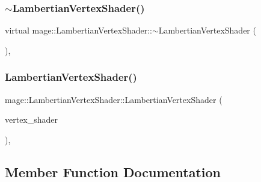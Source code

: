 \hypertarget{classmage_1_1_lambertian_vertex_shader_a55636fd3817b97b6529690d6e3e5cd46}{}\label{classmage_1_1_lambertian_vertex_shader_a55636fd3817b97b6529690d6e3e5cd46} 
\subsubsection{\texorpdfstring{$\sim$\+Lambertian\+Vertex\+Shader()}{~LambertianVertexShader()}}
{\footnotesize\ttfamily virtual mage\+::\+Lambertian\+Vertex\+Shader\+::$\sim$\+Lambertian\+Vertex\+Shader (\begin{DoxyParamCaption}{ }\end{DoxyParamCaption})\hspace{0.3cm}{\ttfamily [virtual]}, {\ttfamily [default]}}

\hypertarget{classmage_1_1_lambertian_vertex_shader_add164d66906e307d95232b2c41567a21}{}\label{classmage_1_1_lambertian_vertex_shader_add164d66906e307d95232b2c41567a21} 
\subsubsection{\texorpdfstring{Lambertian\+Vertex\+Shader()}{LambertianVertexShader()}\hspace{0.1cm}{\footnotesize\ttfamily [2/2]}}
{\footnotesize\ttfamily mage\+::\+Lambertian\+Vertex\+Shader\+::\+Lambertian\+Vertex\+Shader (\begin{DoxyParamCaption}\item[{const \hyperlink{classmage_1_1_lambertian_vertex_shader}{Lambertian\+Vertex\+Shader} \&}]{vertex\+\_\+shader }\end{DoxyParamCaption})\hspace{0.3cm}{\ttfamily [private]}, {\ttfamily [delete]}}



\subsection{Member Function Documentation}
\hypertarget{classmage_1_1_lambertian_vertex_shader_a974b43346ab5d8081d9101f715e7670d}{}\label{classmage_1_1_lambertian_vertex_shader_a974b43346ab5d8081d9101f715e7670d} 
